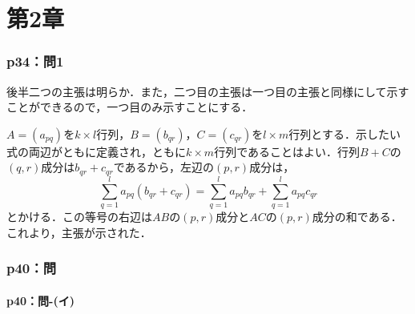 \part*{第2章}


\section*{p34：問1}

\begin{tproof}
  後半二つの主張は明らか．また，二つ目の主張は一つ目の主張と同様にして示すことができるので，一つ目のみ示すことにする．


  $A=(a_{pq})$を$k \times l$行列，$B= (b_{qr})$，$C=(c_{qr})$を$l \times m$行列とする．示したい式の両辺がともに定義され，ともに$k \times m$行列であることはよい．行列$B+C$の$(q,r)$成分は$b_{qr}+c_{qr}$であるから，左辺の$(p,r)$成分は，
  \[
    \sum_{q=1}^{l}a_{pq}\left(b_{qr}+c_{qr}\right)=\sum_{q=1}^{l}a_{pq}b_{qr}+\sum_{q=1}^{l}a_{pq}c_{qr}
  \]
  とかける．この等号の右辺は$AB$の$(p,r)$成分と$AC$の$(p,r)$成分の和である．これより，主張が示された．
\end{tproof}



\section*{p40：問}

\subsection*{p40：問-(イ)}


